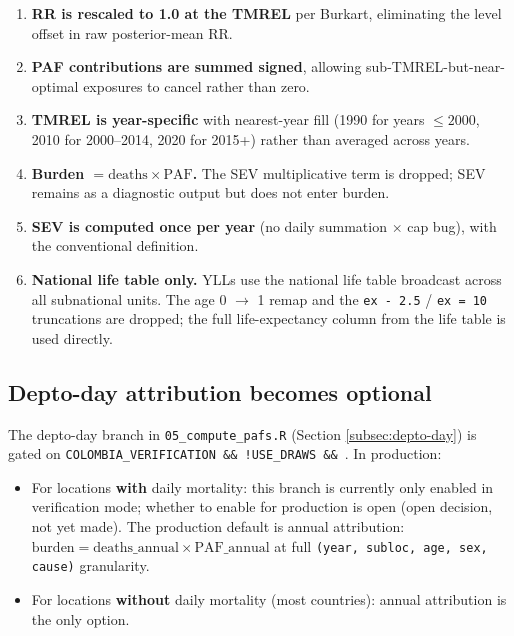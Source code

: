 \documentclass[11pt]{article}
\begin{document}
\begin{enumerate}
  \item \textbf{RR is rescaled to 1.0 at the TMREL} per Burkart, eliminating
    the level offset in raw posterior-mean RR.
  \item \textbf{PAF contributions are summed signed}, allowing
    sub-TMREL-but-near-optimal exposures to cancel rather than zero.
  \item \textbf{TMREL is year-specific} with nearest-year fill (1990 for years
    $\leq 2000$, 2010 for 2000--2014, 2020 for 2015+) rather than
    averaged across years.
  \item \textbf{Burden $= \text{deaths} \times \text{PAF}$.} The SEV
    multiplicative term is dropped; SEV remains as a diagnostic output but
    does not enter burden.
  \item \textbf{SEV is computed once per year} (no daily summation $\times$ cap
    bug), with the conventional definition.
  \item \textbf{National life table only.} YLLs use the national life table
    broadcast across all subnational units. The age 0 $\to$ 1 remap and
    the \texttt{ex - 2.5} / \texttt{ex = 10} truncations are dropped;
    the full life-expectancy column from the life table is used directly.
\end{enumerate}

\subsection{Depto-day attribution becomes optional}

The depto-day branch in \texttt{05\_compute\_pafs.R} (Section
\ref{subsec:depto-day}) is gated on \texttt{COLOMBIA\_VERIFICATION \&\&\ !USE\_DRAWS \&\&\ <daily mortality file present>}. In production:

\begin{itemize}[itemsep=2pt]
  \item For locations \textbf{with} daily mortality: this branch is currently only enabled in
    verification mode; whether to enable for production is open
    (open decision, not yet made). The production default is annual
    attribution: $\text{burden} = \text{deaths\_annual} \times \text{PAF\_annual}$
    at full \texttt{(year, subloc, age, sex, cause)} granularity.
  \item For locations \textbf{without} daily mortality (most countries):
    annual attribution is the only option.
\end{itemize}
\end{document}
